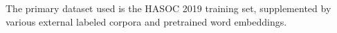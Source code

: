 The primary dataset used is the HASOC 2019 training set, supplemented by various external labeled corpora and pretrained word embeddings.